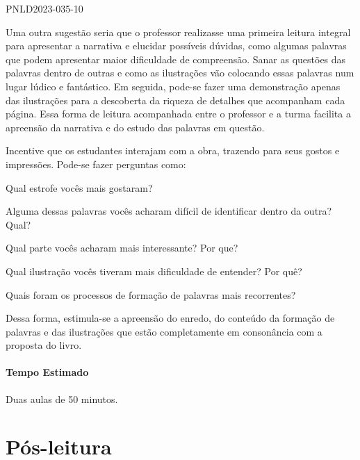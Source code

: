 \documentclass[11pt]{extarticle}
\begin{document}
PNLD2023-035-10

Uma outra sugestão seria que o professor realizasse uma primeira leitura integral para apresentar a narrativa e elucidar possíveis dúvidas, como algumas palavras que podem apresentar maior dificuldade de compreensão. Sanar as questões das palavras dentro de outras e como as ilustrações vão colocando essas palavras num lugar lúdico e fantástico. Em seguida, pode-se fazer uma demonstração apenas das ilustrações para a descoberta da riqueza de detalhes que acompanham cada página. Essa forma de leitura acompanhada entre o professor e a turma facilita a apreensão da narrativa e do estudo das palavras em questão.

Incentive que os estudantes interajam com a obra, trazendo para seus gostos e impressões. Pode-se fazer perguntas como:

\item Qual estrofe vocês mais gostaram?
\item Alguma dessas palavras vocês acharam difícil de identificar dentro da outra? Qual?
\item Qual parte vocês acharam mais interessante? Por que?
\item Qual ilustração vocês tiveram mais dificuldade de entender? Por quê?
\item Quais foram os processos de formação de palavras mais recorrentes?

Dessa forma, estimula-se a apreensão do enredo, do conteúdo da formação de palavras e das ilustrações que estão completamente em consonância com a proposta do livro.

\paragraph{Tempo Estimado} Duas aulas de 50 minutos. 

\section{Pós-leitura}

\end{document}
